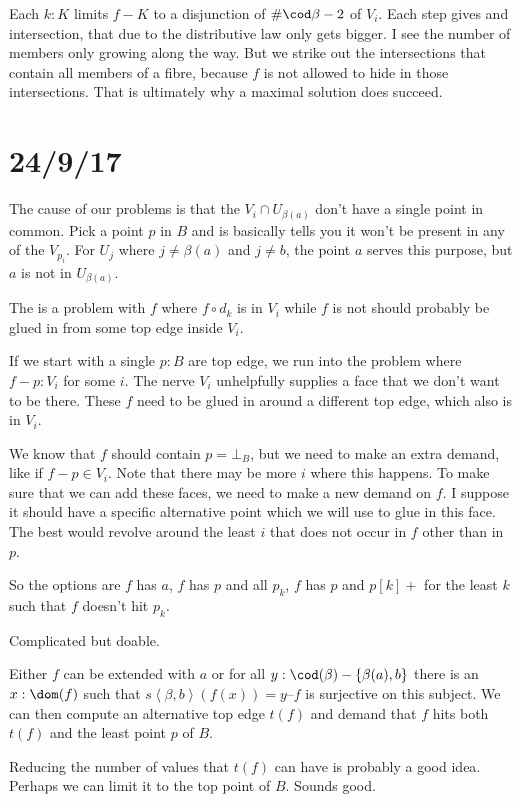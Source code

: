 \documentclass{tac}
\newcommand\set[1]{\left\{#1\right\}}
\newcommand\of{:}
\newcommand\tuplet[1]{\left\langle #1 \right\rangle}
\begin{document}
Each $k\of K$ limits $f-K$ to a disjunction of $\#\cod\beta - 2$ of $V_i$. Each step gives and intersection, that due to the distributive law only gets bigger. I see the number of members only growing along the way. But we strike out the intersections that contain all members of a fibre, because $f$ is not allowed to hide in those intersections. That is ultimately why a maximal solution does succeed. 

\section{24/9/17}

The cause of our problems is that the $V_i\cap U_{\beta(a)}$ don't have a single point in common. Pick a point $p$ in $B$ and is basically tells you it won't be present in any of the $V_{p_i}$.
For $U_j$ where $j\neq \beta(a)$ and $j\neq b$, the point $a$ serves this purpose, but $a$ is not in $U_{\beta(a)}$.

The is a problem with $f$ where $f\circ d_k$ is in $V_i$ while $f$ is not should probably be glued in from some top edge inside $V_i$. 

If we start with a single $p\of B$ are top edge, we run into the problem where $f - p\of V_i$ for some $i$. The nerve $V_i$ unhelpfully supplies a face that we don't want to be there.
These $f$ need to be glued in around a different top edge, which also is in $V_i$.

We know that $f$ should contain $p = \bot_B$, but we need to make an extra demand, like if $f-p\in V_i$. Note that there may be more $i$ where this happens.
To make sure that we can add these faces, we need to make a new demand on $f$. I suppose it should have a specific alternative point which we will use to glue in this face.
The best would revolve around the least $i$ that does not occur in $f$
other than in $p$. 

So the options are $f$ has $a$, $f$ has $p$ and all $p_k$, $f$ has $p$ and $p[k]+$ for the least $k$ such that $f$ doesn't hit $p_k$.

Complicated but doable.

Either $f$ can be extended with $a$ or for all $y\of \cod(\beta)-\set{\beta(a),b}$ there is an $x\of \dom(f)$ such that $s\tuplet{\beta,b}(f(x)) = y$--$f$ is surjective on this subject. We can then compute an alternative top edge $t(f)$ and demand that $f$ hits both $t(f)$ and the least point $p$ of $B$.

Reducing the number of values that $t(f)$ can have is probably a good idea. Perhaps we can limit it to the top point of $B$.
Sounds good.
\end{document}
